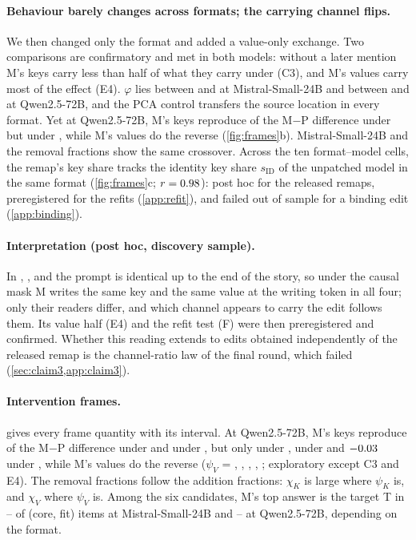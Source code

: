 \paragraph{Behaviour barely changes across formats; the carrying channel flips.} We then changed only the format and added a value-only exchange. Two comparisons are confirmatory and met in both models: without a later mention M's keys carry less than half of what they carry under \fmtOpt{} (C3), and M's values carry most of the effect (E4). $\varphi$ lies between \phiOptMistral{} and \phiLetterMistral{} at Mistral-Small-24B and between \phiNoneQwen{} and \phiBeforeQwen{} at Qwen2.5-72B, and the PCA control transfers the source location in every format. Yet at Qwen2.5-72B, M's keys reproduce \psiLetterQwen{} of the M$-$P difference under \fmtLetter{} but \psiNoneQwen{} under \fmtNone{}, while M's values do the reverse (\cref{fig:frames}b). Mistral-Small-24B and the removal fractions show the same crossover. Across the ten format--model cells, the remap's key share tracks the identity key share $s_{\mathrm{ID}}$ of the unpatched model in the same format (\cref{fig:frames}c; $r = 0.98{}$): post hoc for the released remaps, preregistered for the refits (\cref{app:refit}), and failed out of sample for a binding edit (\cref{app:binding}).

\paragraph{Interpretation (post hoc, discovery sample).} In \fmtLetter{}, \fmtOpt{}, \fmtPost{} and \fmtNone{} the prompt is identical up to the end of the story, so under the causal mask M writes the same key and the same value at the writing token in all four; only their readers differ, and which channel appears to carry the edit follows them. Its value half (E4) and the refit test (F) were then preregistered and confirmed. Whether this reading extends to edits obtained independently of the released remap is the channel-ratio law of the final round, which failed (\cref{sec:claim3,app:claim3}).

\paragraph{Intervention frames.}  gives every frame quantity with its interval. At Qwen2.5-72B, M's keys reproduce \psiLetterQwen{} of the M$-$P difference under \fmtLetter{} and \psiOptQwen{} under \fmtOpt{}, but only \psiPostQwen{} under \fmtPost{}, \psiNoneQwen{} under \fmtNone{} and $-0.03$ under \fmtBefore{}, while M's values do the reverse ($\psi_V$ = \psiVLetterQwen{}, \psiVOptQwen{}, \psiVPostQwen{}, \psiVNoneQwen{}, \psiVBeforeQwen{}; exploratory except C3 and E4). The removal fractions follow the addition fractions: $\chi_K$ is large where $\psi_K$ is, and $\chi_V$ where $\psi_V$ is. Among the six candidates, M's top answer is the target T in \mTLetterMistral{}--\mTPostMistral{} of (core, fit) items at Mistral-Small-24B and \mTNoneQwen{}--\mTBeforeQwen{} at Qwen2.5-72B, depending on the format.

